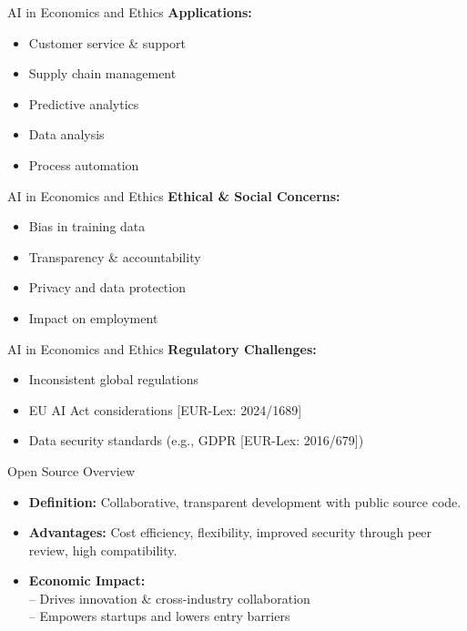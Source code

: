 \documentclass{beamer}
\begin{document}
\begin{frame}{AI in Economics and Ethics}
\textbf{Applications:}
        \begin{itemize}
          \item Customer service \& support
          \item Supply chain management
          \item Predictive analytics
          \item Data analysis
          \item Process automation
        \end{itemize}

\end{frame}

\begin{frame}{AI in Economics and Ethics}
\textbf{Ethical \& Social Concerns:}
        \begin{itemize}
          \item Bias in training data
          \item Transparency \& accountability
          \item Privacy and data protection
          \item Impact on employment
        \end{itemize}
\end{frame}

\begin{frame}{AI in Economics and Ethics}
\textbf{Regulatory Challenges:}
            \begin{itemize}
                \item Inconsistent global regulations 
                \item EU AI Act considerations [EUR-Lex: 2024/1689]
                \item Data security standards (e.g., GDPR [EUR-Lex: 2016/679])
            \end{itemize}
\end{frame}




\begin{frame}{Open Source Overview}
    \begin{itemize}
      \item \textbf{Definition:} Collaborative, transparent development with public source code.
      \item \textbf{Advantages:} Cost efficiency, flexibility, improved security through peer review, high compatibility.
      \item \textbf{Economic Impact:} \\
        \quad -- Drives innovation \& cross-industry collaboration \\
        \quad -- Empowers startups and lowers entry barriers
    \end{itemize}
  \end{frame}
  
\end{document}
